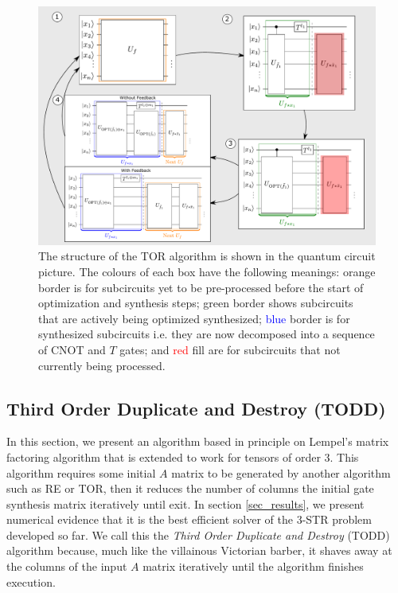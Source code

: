 \documentclass[notitlepage]{article}
\theoremstyle{definition}
\theoremstyle{problem}
\theoremstyle{lemma}
\begin{document}
\FloatBarrier

\begin{figure}
	\centering	
	\includegraphics[width=0.95\linewidth]{TORfig3}
	\caption{The structure of the TOR algorithm is shown in the quantum circuit picture. The colours of each box have the following meanings: \textcolor{orange!80!black}{orange} border is for subcircuits yet to be pre-processed before the start of optimization and synthesis steps; \textcolor{green!50!black}{green} border shows subcircuits that are actively being optimized synthesized; \textcolor{blue}{blue} border is for synthesized subcircuits i.e. they are now decomposed into a sequence of CNOT and $T$ gates; and \textcolor{red}{red} fill are for subcircuits that not currently being processed.}
	\label{fig_TOR}
\end{figure}

\FloatBarrier

\subsection{Third Order Duplicate and Destroy (TODD)}
\label{sec_TODD}
In this section, we present an algorithm based in principle on Lempel's matrix factoring algorithm \cite{8_Lempel_1975} that is extended to work for tensors of order 3. This algorithm requires some initial $A$ matrix to be generated by another algorithm such as RE or TOR, then it reduces the number of columns the initial gate synthesis matrix iteratively until exit. In section \ref{sec_results}, we present numerical evidence that it is the best efficient solver of the 3-STR problem developed so far.
We call this the \emph{Third Order Duplicate and Destroy} (TODD) algorithm because, much like the villainous Victorian barber, it shaves away at the columns of the input $A$ matrix iteratively until the algorithm finishes execution.
\end{document}
